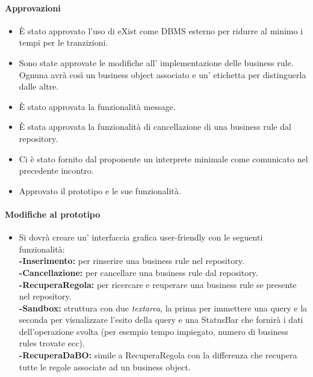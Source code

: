 \documentclass[11pt,titlepage,a4paper]{report}
\begin{document}
\paragraph{Approvazioni}
\begin{itemize}
\item \`E stato approvato l'uso di eXist come DBMS esterno per ridurre al minimo i tempi per le tranzizioni.
\item Sono state approvate le modifiche all' implementazione delle business rule. Ognuna avr\`a cos\`i un business object associato e un' etichetta per distinguerla dalle altre.
\item \`E stato approvata la funzionalit\`a message.
\item \`E stata approvata la funzionalit\`a di cancellazione di una business rule dal repository.
\item Ci \`e stato fornito dal proponente un interprete minimale come comunicato nel precedente incontro.
\item Approvato il prototipo e le sue funzionalit\`a.
\end{itemize}

\paragraph{Modifiche al prototipo}
\begin{itemize}
\item Si dovr\`a creare un' interfaccia grafica user-friendly con le seguenti funzionalit\`a:\\
\textbf{-Inserimento:} per rinserire una business rule nel repository.\\
\textbf{-Cancellazione:} per cancellare una business rule dal repository.\\
\textbf{-RecuperaRegola:} per ricercare e reuperare una business rule se presente nel repository.\\
\textbf{-Sandbox: }struttura con due \textit{textarea}, la prima per immettere una query e la seconda per visualizzare l'esito della query e una StatusBar che fornir\`a i dati dell'operazione svolta (per esempio tempo impiegato, numero di business rules trovate ecc).\\
\textbf{-RecuperaDaBO: }simile a RecuperaRegola con la differenza che recupera tutte le regole associate ad un business object.\\
\end{itemize}
\end{document}

